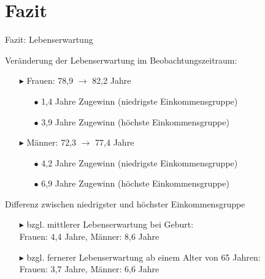 \documentclass{beamer}
\begin{document}
\section{Fazit}
\begin{frame}{Fazit: Lebenserwartung}
	\begin{block}{Veränderung der Lebenserwartung im Beobachtungszeitraum:}
		\begin{itemize}
			\item[$\blacktriangleright$] Frauen: 78,9 $\rightarrow$ 82,2 Jahre\\
			\begin{itemize}
			\item[$\bullet$] 1,4 Jahre Zugewinn (niedrigste Einkommensgruppe)
			\item[$\bullet$] 3,9 Jahre Zugewinn (höchste Einkommensgruppe)
			\end{itemize}								
			\item[$\blacktriangleright$] Männer: 72,3 $\rightarrow$ 77,4 Jahre
			\begin{itemize}
				\item[$\bullet$] 4,2 Jahre Zugewinn (niedrigste Einkommensgruppe)
				\item[$\bullet$] 6,9 Jahre Zugewinn (höchste Einkommensgruppe)
			\end{itemize}
		\end{itemize}
	\end{block}
	\pause
	\begin{block}{Differenz zwischen niedrigster und höchster Einkommensgruppe}
		\begin{itemize}
			\item[$\blacktriangleright$] bzgl. mittlerer Lebenserwartung bei Geburt:\\ Frauen: 4,4 Jahre, Männer: 8,6 Jahre
			\item[$\blacktriangleright$] bzgl. fernerer Lebenserwartung ab einem Alter von 65 Jahren:\\ Frauen: 3,7 Jahre, Männer: 6,6 Jahre
		\end{itemize}
	\end{block}
\end{frame}
\end{document}
